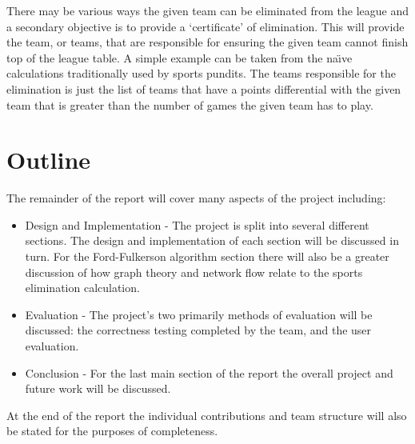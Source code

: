 There may be various ways the given team can be eliminated from the league
and a secondary objective is to provide a `certificate' of elimination. This
will provide the team, or teams, that are responsible for ensuring the given
team cannot finish top of the league table. A simple example can be taken
from the na\"{\i}ve calculations traditionally used by sports pundits. The
teams responsible for the elimination is just the list of teams that have a
points differential with the given team that is greater than the number of 
games the given team has to play.

\section{Outline}

The remainder of the report will cover many aspects of the project including:

\begin{itemize}
\item Design and Implementation - The project is split into several different
sections. The design and implementation of each section will be discussed in
turn. For the Ford-Fulkerson algorithm section there will also be a greater
discussion of how graph theory and network flow relate to the sports
elimination calculation.
\item Evaluation - The project's two primarily methods of evaluation will be
discussed: the correctness testing completed by the team, and the user
evaluation.
\item Conclusion - For the last main section of the report the overall
project and future work will be discussed.
\end{itemize}

At the end of the report the individual contributions and team structure will
also be stated for the purposes of completeness.